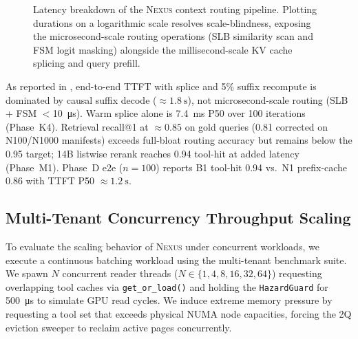 \documentclass[conference,10pt]{IEEEtran}
\newcommand{\Nexus}{\textsc{Nexus}\xspace}
\begin{document}
\begin{figure}[h]
\centering
{}
\caption{Latency breakdown of the \Nexus context routing pipeline. Plotting durations on a logarithmic scale resolves scale-blindness, exposing the microsecond-scale routing operations (SLB similarity scan and FSM logit masking) alongside the millisecond-scale KV cache splicing and query prefill.}
\label{fig:breakdown_chart}
\end{figure}
  As reported in , end-to-end TTFT with splice and 5\% suffix recompute is dominated by causal suffix decode (\(\approx\!\SI{1.8}{\second}\)), not microsecond-scale routing (SLB + FSM $<$\SI{10}{\micro\second}). Warm splice alone is \SI{7.4}{\milli\second} P50 over 100 iterations (Phase~K4). Retrieval recall@1 at \(\approx\!0.85\) on gold queries (0.81 corrected on N100/N1000 manifests) exceeds full-bloat routing accuracy but remains below the 0.95 target; 14B listwise rerank reaches 0.94 tool-hit at added latency (Phase~M1). Phase~D e2e ($n{=}100$) reports B1 tool-hit 0.94 vs.\ N1 prefix-cache 0.86 with TTFT P50 \(\approx\!\SI{1.2}{\second}\).

\subsection{Multi-Tenant Concurrency Throughput Scaling}
\label{subsec:eval-concurrency}
To evaluate the scaling behavior of \Nexus under concurrent workloads, we execute a continuous batching workload using the multi-tenant benchmark suite. We spawn $N$ concurrent reader threads ($N \in \{1, 4, 8, 16, 32, 64\}$) requesting overlapping tool caches via \texttt{get\_or\_load()} and holding the \texttt{HazardGuard} for \SI{500}{\micro\second} to simulate GPU read cycles. We induce extreme memory pressure by requesting a tool set that exceeds physical NUMA node capacities, forcing the 2Q eviction sweeper to reclaim active pages concurrently.
\end{document}

